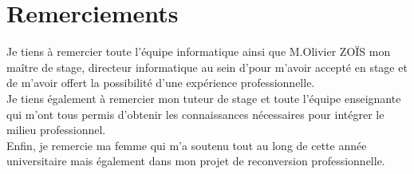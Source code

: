 \section*{Remerciements}
\noindent
{}
{}


Je tiens à remercier toute l'équipe informatique ainsi que M.Olivier ZOÏS mon maître de stage, directeur informatique 
au sein d'\interlog  pour m’avoir accepté en stage et de m’avoir
offert la possibilité d’une expérience professionnelle.\\


Je tiens également à remercier mon tuteur de stage et toute l’équipe enseignante qui
m’ont tous permis d’obtenir les connaissances nécessaires pour intégrer le milieu
professionnel.\\


Enfin, je remercie ma femme qui m’a soutenu tout au long de cette année universitaire
mais également dans mon projet de reconversion professionnelle.

\newpage



